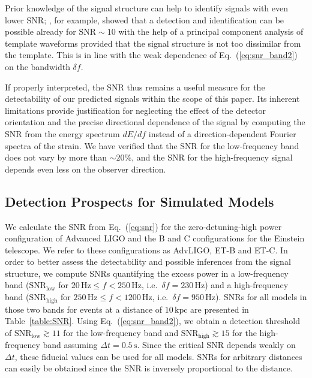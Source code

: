 Prior knowledge of the signal structure
can help to identify signals  with even lower SNR; \citet{logue_12},
for example, showed that a detection and identification can be
possible already for $\mathrm{SNR} \sim 10$ with the help of a
principal component analysis of template waveforms provided that the
signal structure is not too dissimilar from the template. This is
in line with the weak dependence of Eq.~(\ref{eq:snr_band2})
on the bandwidth $\delta f$.

If properly interpreted, the SNR thus remains a useful measure for the
detectability of our predicted signals within the scope of this paper.
Its inherent limitations provide justification for neglecting the
effect of the detector orientation and the
precise directional dependence of the signal by computing the SNR from
the energy spectrum $d E/df$ instead of a direction-dependent Fourier
spectra of the strain. We have verified that the SNR for
the low-frequency band does not vary by more than $\mathord{\sim} 20\%$,
and the SNR for the high-frequency signal depends even less on the
observer direction.

\subsection{Detection Prospects for Simulated Models}
We calculate the SNR from Eq.~(\ref{eq:snr}) for the zero-detuning-high power configuration
of Advanced LIGO \citep{adv_sens} and the B \citep{et_b} and C \citep{et_c} configurations for the Einstein
telescope. We refer to these configurations as AdvLIGO, ET-B
and ET-C. In order to better assess the detectability and possible
inferences from the signal structure, we compute SNRs quantifying the
excess power in a low-frequency band ($\mathrm{SNR}_\mathrm{low}$ for
$20 \, \mathrm{Hz} \le f < 250 \, \mathrm{Hz}$,
i.e.\ $\delta f= 230 \, \mathrm{Hz}$) and a high-frequency
band ($\mathrm{SNR}_\mathrm{high}$ for $250 \, \mathrm{Hz} \le f <
1200 \, \mathrm{Hz}$, i.e.\ $\delta f= 950 \, \mathrm{Hz}$). SNRs for all models in
those two bands for events at a distance of $10 \, \mathrm{kpc}$ are
presented in Table~\ref{table:SNR}. Using
Eq.~(\ref{eq:snr_band2}), we obtain a detection threshold of
$\mathrm{SNR}_{\mathrm{low}} \gtrsim 11$ for the low-frequency band and
$\mathrm{SNR}_{\mathrm{high}} \gtrsim 15$ for the high-frequency band assuming
$\Delta t=0.5 \, \mathrm{s}$. Since the critical SNR depends
weakly on $\Delta t$, these fiducial values can be used for all
models. SNRs for arbitrary distances can easily be obtained since the
SNR is inversely proportional to the distance.

